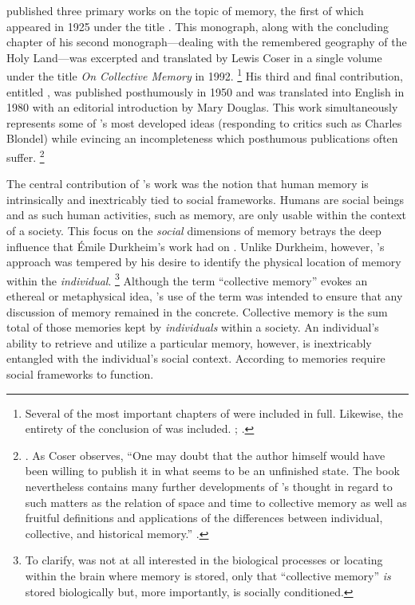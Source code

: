 \halbwachs published three primary works on the topic of memory, the first of which appeared in 1925 under the title .%
    \autocite{halbwachs1925}
This monograph, along with the concluding chapter of his second monograph---dealing with the remembered geography of the Holy Land---was excerpted and translated by Lewis Coser in a single volume under the title \emph{On Collective Memory} in 1992.%
    \footnote{%
        Several of the most important chapters of  were included in full. Likewise, the entirety of the conclusion of  was included. 
        \cite{halbwachs1992};
        \cite{halbwachs1941}.}
His third and final contribution, entitled , was published posthumously in 1950 and was translated into English in 1980 with an editorial introduction by Mary Douglas.%
    \autocite{halbwachs1980}
This work simultaneously represents some of \halbwachs's most developed ideas (responding to critics such as Charles Blondel) while evincing an incompleteness which posthumous publications often suffer.%
    \footnote{%
        \Cite{halbwachs1980}. 
        As Coser observes, ``One may doubt that the author himself would have been willing to publish it in what seems to be an unfinished state. The book nevertheless contains many further developments of \halbwachs's thought in regard to such matters as the relation of space and time to collective memory as well as fruitful definitions and applications of the differences between individual, collective, and historical memory.''
        \cite[2]{coser_halbwachs1992}.}

The central contribution of \halbwachs's work was the notion that human memory is intrinsically and inextricably tied to social frameworks.%
    \autocite[37--38]{halbwachs1992}
Humans are social beings and as such human activities, such as memory, are only usable within the context of a society. This focus on the \emph{social} dimensions of memory betrays the deep influence that Émile Durkheim's work had on \halbwachs.%
    \autocite[8--9]{coser_halbwachs1992}
Unlike Durkheim, however, \halbwachs's approach was tempered by his desire to identify the physical location of memory within the \emph{individual}.%
    \footnote{%
        To clarify, \halbwachs was not at all interested in the biological processes or locating within the brain where memory is stored, only that ``collective memory'' \emph{is} stored biologically but, more importantly, is socially conditioned.}
%
Although the term ``collective memory'' evokes an ethereal or metaphysical idea, \halbwachs's use of the term was intended to ensure that any discussion of memory remained in the concrete. Collective memory is the sum total of those memories kept by \emph{individuals} within a society. An individual's ability to retrieve and utilize a particular memory, however, is inextricably entangled with the individual's social context. According to \halbwachs memories require social frameworks to function.%
    \autocite[38]{halbwachs1992}  

